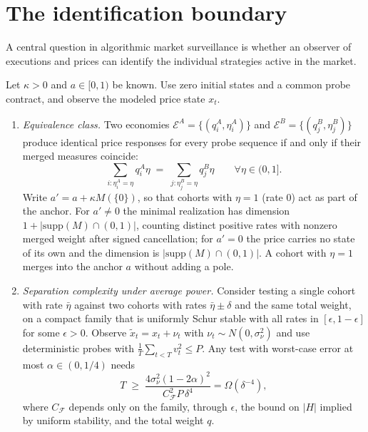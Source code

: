 \section{The identification boundary}\label{sec:ident}

A central question in algorithmic market surveillance is whether an observer of executions and prices can identify the individual strategies active in the market.

\begin{theorem}\label{thm:merged}
Let $\kappa>0$ and $a\in[0,1)$ be known. Use zero initial states and a common probe contract, and observe the modeled price state $x_t$.
\begin{enumerate}[label=(\roman*)]
\item \emph{Equivalence class.} Two economies $\mathcal E^A=\{(q_i^A,\eta_i^A)\}$ and $\mathcal E^B=\{(q_j^B,\eta_j^B)\}$ produce identical price responses for every probe sequence if and only if their merged measures coincide:
\begin{equation}\label{eq:merged}
\sum_{i:\eta_i^A=\eta} q_i^A\eta \;=\; \sum_{j:\eta_j^B=\eta} q_j^B\eta\qquad\forall\eta\in(0,1].
\end{equation}
Write $a'=a+\kappa M(\{0\})$, so that cohorts with $\eta=1$ (rate $0$) act as part of the anchor. For $a'\neq0$ the minimal realization has dimension $1+|\mathrm{supp}(M)\cap(0,1)|$, counting distinct positive rates with nonzero merged weight after signed cancellation; for $a'=0$ the price carries no state of its own and the dimension is $|\mathrm{supp}(M)\cap(0,1)|$. A cohort with $\eta=1$ merges into the anchor $a$ without adding a pole.
\item \emph{Separation complexity under average power.} Consider testing a single cohort with rate $\bar\eta$ against two cohorts with rates $\bar\eta\pm\delta$ and the same total weight, on a compact family that is uniformly Schur stable with all rates in $[\epsilon,1-\epsilon]$ for some $\epsilon>0$. Observe $\tilde x_t=x_t+\nu_t$ with $\nu_t\sim N(0,\sigma_\nu^2)$ and use deterministic probes with $\frac1T\sum_{t<T}v_t^2\le P$. Any test with worst-case error at most $\alpha\in(0,1/4)$ needs
\begin{equation}\label{eq:Tpower}
T\;\ge\;\frac{4\sigma_\nu^2(1-2\alpha)^2}{C_{\mathcal F}^2P\,\delta^4}=\Omega(\delta^{-4}),
\end{equation}
where $C_{\mathcal F}$ depends only on the family, through $\epsilon$, the bound on $|H|$ implied by uniform stability, and the total weight $q$.
\end{enumerate}
\end{theorem}

